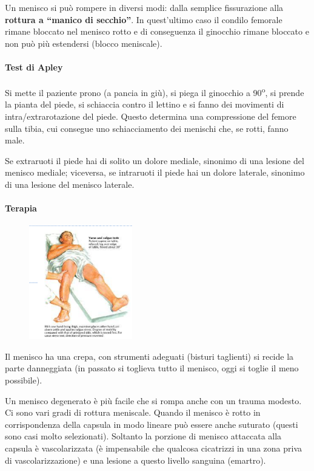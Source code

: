 Un menisco si può rompere in diversi modi: dalla semplice fissurazione alla \textbf{rottura a ``manico di secchio''}. In quest'ultimo caso il condilo femorale rimane bloccato nel menisco rotto e di conseguenza il
ginocchio rimane bloccato e non può più estendersi (blocco meniscale).

\paragraph{Test di Apley}

Si mette il paziente prono (a pancia in giù), si piega il ginocchio a 90\textsuperscript{o}, si prende la pianta del piede, si schiaccia contro il lettino e si
fanno dei movimenti di intra/extrarotazione del piede. Questo determina una compressione del femore sulla tibia, cui consegue uno schiacciamento dei menischi che, se rotti, fanno male.

Se extraruoti il piede hai di solito un dolore mediale, sinonimo di una lesione del menisco mediale; viceversa, se intraruoti il piede hai un dolore laterale, sinonimo di una lesione del menisco laterale.

\paragraph{Terapia}

\begin{figure}[!ht]
\centering
\includegraphics[width=0.4\textwidth]{009/image14.png}
\end{figure}

Il menisco ha una crepa, con strumenti adeguati (bisturi taglienti) si recide la parte danneggiata (in passato si toglieva tutto il menisco, oggi si toglie il meno possibile).

Un menisco degenerato è più facile che si rompa anche con un trauma modesto. Ci sono vari gradi di rottura meniscale. Quando il menisco è rotto in corrispondenza della capsula in modo lineare può essere anche suturato (questi sono casi molto selezionati). Soltanto la porzione di menisco attaccata alla capsula è vascolarizzata (è impensabile che qualcosa cicatrizzi in una zona priva di vascolarizzazione) e una lesione a questo livello sanguina (emartro).

